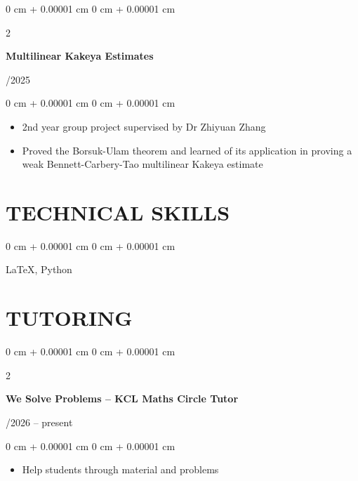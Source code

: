 \documentclass[10pt, letterpaper]{article}
\newenvironment{highlights}{
    \begin{itemize}[
        topsep=0.10 cm,
        parsep=0.10 cm,
        partopsep=0pt,
        itemsep=0pt,
        leftmargin=0 cm + 10pt
    ]
}{
    \end{itemize}
}
\newenvironment{onecolentry}{
    \begin{adjustwidth}{
        0 cm + 0.00001 cm
    }{
        0 cm + 0.00001 cm
    }
}{
    \end{adjustwidth}
}
\newenvironment{twocolentry}[2][]{
    \onecolentry
    \def\secondColumn{#2}
    \setcolumnwidth{\fill, 4.5 cm}
    \begin{paracol}{2}
}{
    \switchcolumn \raggedleft \secondColumn
    \end{paracol}
    \endonecolentry
} %
\begin{document}
        \begin{twocolentry}{
            06/2025
        }
            \textbf{Multilinear Kakeya Estimates}
        \end{twocolentry}

        \vspace{0.10 cm}
        \begin{onecolentry}
            \begin{highlights}
                \item 2nd year group project supervised by Dr Zhiyuan Zhang
                \item Proved the Borsuk-Ulam theorem and learned of its application in proving a weak Bennett-Carbery-Tao multilinear Kakeya estimate
            \end{highlights}
        \end{onecolentry}


        \vspace{0.2 cm}

    \section{TECHNICAL SKILLS}

        \begin{onecolentry}{
            
        }
            \LaTeX, Python
        \end{onecolentry}

        \vspace{0.2 cm}

    \section{TUTORING}

        \begin{twocolentry}{
            01/2026 -- present
        }
            \textbf{We Solve Problems -- KCL Maths Circle Tutor}
        \end{twocolentry}

        \vspace{0.10 cm}
        \begin{onecolentry}
            \begin{highlights}
                \item Help students through material and problems
            \end{highlights}
        \end{onecolentry}
\end{document}
